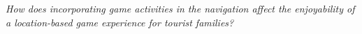 \emph{How does incorporating game activities in the navigation affect the enjoyability of a location-based game experience for tourist families?}



